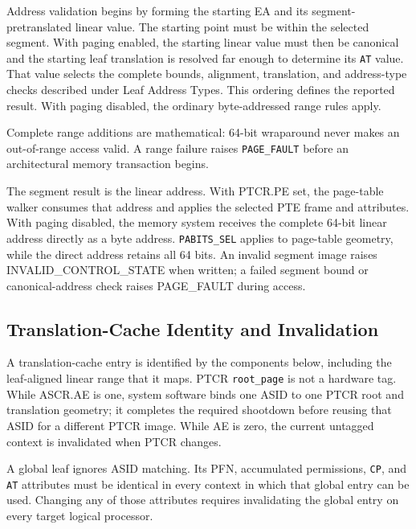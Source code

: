 Address validation begins by forming the starting EA and its segment-pretranslated linear value. The starting point
must be within the selected segment. With paging enabled, the starting linear value must then be canonical and the
starting leaf translation is resolved far enough to determine its \texttt{AT} value. That value selects the complete
bounds, alignment, translation, and address-type checks described under Leaf Address Types. This ordering defines
the reported result. With paging disabled, the ordinary byte-addressed range rules apply.

Complete range additions are mathematical: 64-bit wraparound never makes an out-of-range access valid. A range
failure raises \texttt{PAGE\_FAULT} before an architectural memory transaction begins.

The segment result is the linear address. With PTCR.PE set, the page-table walker consumes that address and applies
the selected PTE frame and attributes. With paging disabled, the memory system receives the complete 64-bit linear
address directly as a byte address. \texttt{PABITS\_SEL} applies to page-table geometry, while the direct address
retains all 64 bits. An invalid segment image raises INVALID\_CONTROL\_STATE when written; a failed segment bound or
canonical-address check raises PAGE\_FAULT during access.





\subsection{Translation-Cache Identity and Invalidation}
A translation-cache entry is identified by the components below, including the leaf-aligned linear range that it
maps. PTCR \texttt{root\_page} is not a hardware tag.
While ASCR.AE is one, system software binds one ASID to one PTCR root and translation geometry; it completes the
required shootdown before reusing that ASID for a different PTCR image. While AE is zero, the current untagged
context is invalidated when PTCR changes.



A global leaf ignores ASID matching. Its PFN, accumulated permissions, \texttt{CP}, and \texttt{AT} attributes must
be identical in every context in which that global entry can be used. Changing any of those attributes requires
invalidating the global entry on every target logical processor.

